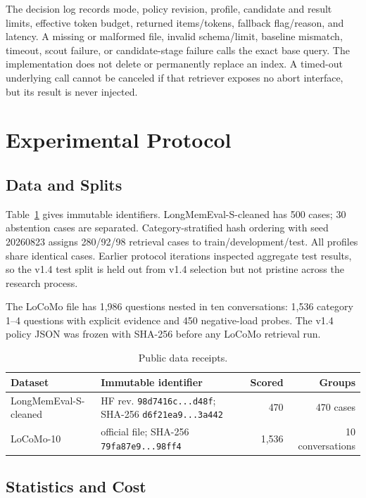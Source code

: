 \documentclass[10pt]{article}
\newcommand{\code}[1]{\texttt{#1}}
\begin{document}
The decision log records mode, policy revision, profile, candidate and result
limits, effective token budget, returned items/tokens, fallback flag/reason,
and latency. A missing or malformed file, invalid schema/limit, baseline
mismatch, timeout, scout failure, or candidate-stage failure calls the exact
base query. The implementation does not delete or permanently replace an
index. A timed-out underlying call cannot be canceled if that retriever exposes
no abort interface, but its result is never injected.

\section{Experimental Protocol}

\subsection{Data and Splits}

Table~\ref{tab:data} gives immutable identifiers. LongMemEval-S-cleaned has 500
cases; 30 abstention cases are separated. Category-stratified hash ordering
with seed 20260823 assigns 280/92/98 retrieval cases to train/development/test.
All profiles share identical cases. Earlier protocol iterations inspected
aggregate test results, so the v1.4 test split is held out from v1.4 selection
but not pristine across the research process.

The LoCoMo file has 1,986 questions nested in ten conversations: 1,536
category 1--4 questions with explicit evidence and 450 negative-load probes.
The v1.4 policy JSON was frozen with SHA-256 before any LoCoMo retrieval run.

\begin{table}[t]
\centering
\small
\caption{Public data receipts.}
\label{tab:data}
\begin{tabularx}{\textwidth}{@{}lXrr@{}}
\toprule
Dataset & Immutable identifier & Scored & Groups \\
\midrule
LongMemEval-S-cleaned & HF rev. \code{98d7416c...d48f}; SHA-256
\code{d6f21ea9...3a442} & 470 & 470 cases \\
LoCoMo-10 & official file; SHA-256 \code{79fa87e9...98ff4} & 1,536 & 10 conversations \\
\bottomrule
\end{tabularx}
\end{table}

\subsection{Statistics and Cost}
\end{document}
